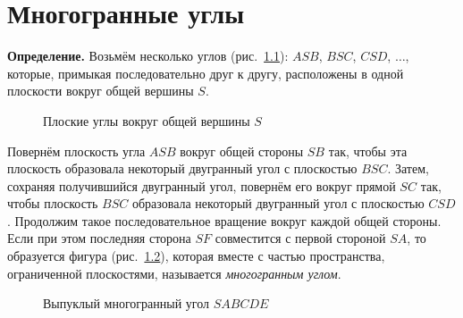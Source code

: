 \chapter{Многогранные углы}\label{ch:ch5}

\begingroup
\setlength{\intextsep}{10pt plus 2pt minus 2pt}
\setlength{\textfloatsep}{12pt plus 2pt minus 2pt}

\newcommand*{\kiselevPlanimetryPage}[2]{%
    \href{https://commons.wikimedia.org/wiki/File:\%D0\%90._\%D0\%9F._\%D0\%9A\%D0\%B8\%D1\%81\%D0\%B5\%D0\%BB\%D1\%91\%D0\%B2._\%D0\%AD\%D0\%BB\%D0\%B5\%D0\%BC\%D0\%B5\%D0\%BD\%D1\%82\%D0\%B0\%D1\%80\%D0\%BD\%D0\%B0\%D1\%8F_\%D0\%B3\%D0\%B5\%D0\%BE\%D0\%BC\%D0\%B5\%D1\%82\%D1\%80\%D0\%B8\%D1\%8F_(1914).djvu?page=#1}{#2}%
}

 \textbf{Определение.} Возьмём несколько углов (рис.~\ref{fig:kiselev-stereo-343}): \(ASB\), \(BSC\), \(CSD\), \(\ldots\), которые, примыкая последовательно друг к другу, расположены в одной плоскости вокруг общей вершины \(S\).

\begin{figure}[htbp]
    \centering
    \renewcommand{\thefigure}{343}
    \captionsetup{name=Рис.,labelsep=period}
    
    \caption{Плоские углы вокруг общей вершины \(S\)}\label{fig:kiselev-stereo-343}
\end{figure}

Повернём плоскость угла \(ASB\) вокруг общей стороны \(SB\) так, чтобы эта плоскость образовала некоторый двугранный угол с плоскостью \(BSC\). Затем, сохраняя получившийся двугранный угол, повернём его вокруг прямой
\(SC\) так, чтобы плоскость \(BSC\) образовала некоторый двугранный угол с плоскостью \(CSD\). Продолжим такое последовательное вращение вокруг каждой общей стороны. Если при этом последняя сторона \(SF\) совместится с первой стороной \(SA\), то образуется фигура (рис.~\ref{fig:kiselev-stereo-344}), которая вместе с частью пространства, ограниченной плоскостями, называется \emph{многогранным углом}.

\begin{figure}[htbp]
    \centering
    \renewcommand{\thefigure}{344}
    \captionsetup{name=Рис.,labelsep=period}
    
    \caption{Выпуклый многогранный угол \(SABCDE\)}\label{fig:kiselev-stereo-344}
\end{figure}

